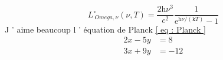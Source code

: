 \begin {equation}
  L _{\ Omega ,\nu }^{\circ } (\nu ,T ) =\frac {2\mathrm { h } \nu ^{3}}{
    c ^{2}} \frac {1}{\mathrm { e } ^{\mathrm { h } \nu /(\mathrm { k }
    T ) } -1}
  \label { eq : Planck } %
\end {equation}
J ’ aime beaucoup l ’ équation de Planck \ref{ eq : Planck }
\begin{align}
2x - 5y &=   8 \\
3x + 9y &=   -12
\end{align}
